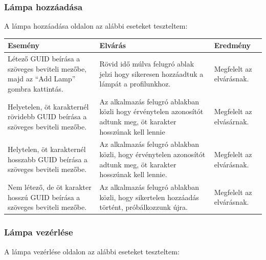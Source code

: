 \documentclass[a4paper,12pt]{report}
\begin{document}
    \subsubsection{Lámpa hozzáadása}
    A lámpa hozzáadása oldalon az alábbi eseteket teszteltem:

    \begin{center}
        \begin{tabular}{ | m{4.5cm} | m{4.5cm} | m{4.5cm} |}
            \hline
            Esemény & Elvárás & Eredmény \\ \hline
            Létező GUID beírása a szöveges beviteli mezőbe, majd az ``Add Lamp'' gombra kattintás. & Rövid idő múlva felugró ablak jelzi
            hogy sikeresen hozzáadtuk a lámpát a profilunkhoz. & Megfelelt az elvárásnak. \\ \hline
            Helyetelen, öt karakternél rövidebb GUID beírása a szöveges beviteli mezőbe. & Az alkalmazás felugró ablakban közli hogy érvénytelen
            azonosítót adtunk meg, öt karakter hosszúnak kell lennie & Megfelelt az elvásárnak. \\ \hline
            Helytelen, öt karakternél hosszabb GUID beírása a szöveges beviteli mezőbe. & Az alkalmazás felugró ablakban közli, hogy érvénytelen
            azonosítót adtunk meg, öt karakter hosszúnak kell lennie. & Megfelelt az elvárásnak. \\ \hline
            Nem létező, de öt karakter hosszú GUID beírása a szöveges beviteli mezőbe. & Az alkalmazás felugró ablakban közli, hogy sikertelen
            hozzáadás történt, próbálkozzunk újra. & Megfelelt az elvárásnak. \\
            \hline
        \end{tabular}
    \end{center}

    \subsubsection{Lámpa vezérlése}
    A lámpa vezérlése oldalon az alábbi eseteket teszteltem:
\end{document}
